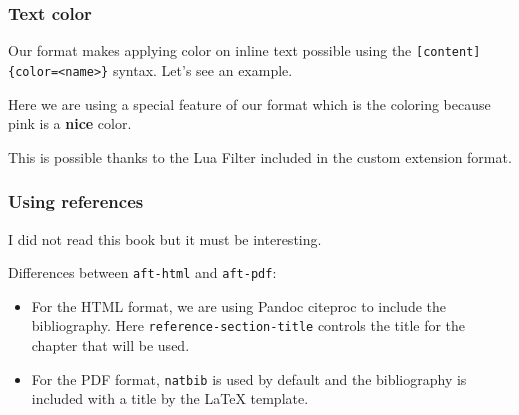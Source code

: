 \documentclass[fleqn,10pt]{wlscirep}
\providecommand{\tightlist}{%
  \setlength{\itemsep}{0pt}\setlength{\parskip}{0pt}}
\begin{document}
\hypertarget{sec-summary}{%
\subsubsection{Text color}\label{sec-summary}}

Our format makes applying color on inline text possible using the
\texttt{{[}content{]}\{color=\textless{}name\textgreater{}\}} syntax.
Let's see an example.

Here we are using a special feature of our format which is the coloring
because \textcolor{mypink}{pink is a \textbf{nice} color}.

This is possible thanks to the Lua Filter included in the custom
extension format.

\hypertarget{using-references}{%
\subsubsection*{Using references}\label{using-references}}

I did not read this book \citep{behringer2014manipulating} but it must
be interesting.

Differences between \texttt{aft-html} and \texttt{aft-pdf}:

\begin{itemize}
\tightlist
\item
  For the HTML format, we are using Pandoc citeproc to include the
  bibliography. Here \texttt{reference-section-title} controls the title
  for the chapter that will be used.
\item
  For the PDF format, \texttt{natbib} is used by default and the
  bibliography is included with a title by the LaTeX template.
\end{itemize}
\end{document}
